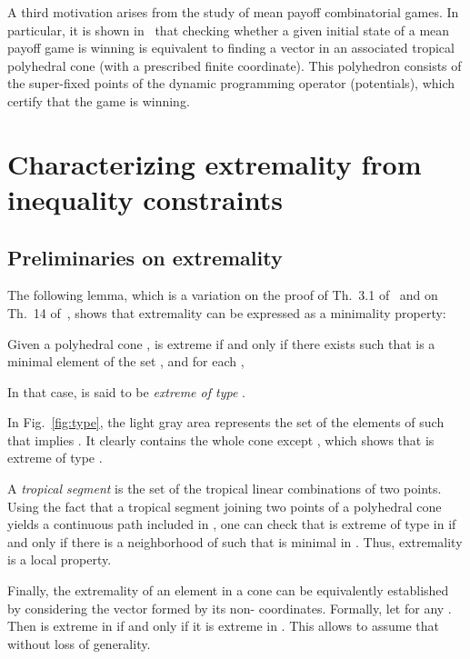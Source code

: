\documentclass[proceedings]{stacs}
\begin{document}
A third motivation arises from the study of mean payoff
combinatorial games. In particular, it is shown in~\cite{AGGut09}
that checking whether a given initial state of a mean payoff game is
winning is equivalent to finding a vector in an associated
tropical polyhedral cone (with a prescribed finite coordinate).
This polyhedron consists
of the super-fixed points of the dynamic programming operator
(potentials), which certify that the game is winning.

\section{Characterizing extremality from inequality constraints}\label{sec:extremality_criterion}

\subsection{Preliminaries on extremality}

The following lemma, which is a variation on the proof of Th.~3.1 of~\cite{GK} and on Th.~14 of~\cite{BSS}, 
shows that extremality can be expressed as a minimality property:
\begin{proposition}\label{prop:minimality}
Given a polyhedral cone ,  is extreme if and only if there exists  such that  is a minimal element of the set , \ie{}  and for each , 

In that case,  is said to be \emph{extreme of type }.
\end{proposition}





In Fig.~\ref{fig:type}, the light gray area represents the set of the elements  of  such that  implies . It clearly contains the whole cone except , which shows that  is extreme of type .


A {\em tropical segment} is the set of the tropical 
linear combinations of two points. Using the fact
that a tropical segment joining two points of a polyhedral cone 
yields a continuous path included in , one can check that  is extreme of type  in  if and only if 
there is a neighborhood  of  such that  is minimal in . Thus, extremality is a local property.

Finally, the extremality of an element  in a cone  can be equivalently established by considering the vector formed by its non- coordinates. 
Formally, let  for any .
Then  is extreme in  if and only if it is extreme in . This allows to assume that  without loss of generality.
\end{document}

